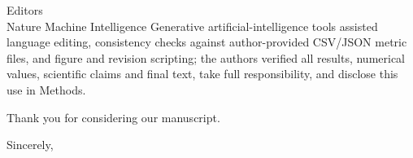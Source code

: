 \documentclass[10pt]{letter}
\begin{document}
\begin{letter}{Editors\\Nature Machine Intelligence}
Generative artificial-intelligence tools assisted language editing, consistency checks against author-provided CSV/JSON metric files, and figure and revision scripting; the authors verified all results, numerical values, scientific claims and final text, take full responsibility, and disclose this use in Methods.

Thank you for considering our manuscript.

\closing{Sincerely,}
\end{letter}
\end{document}
